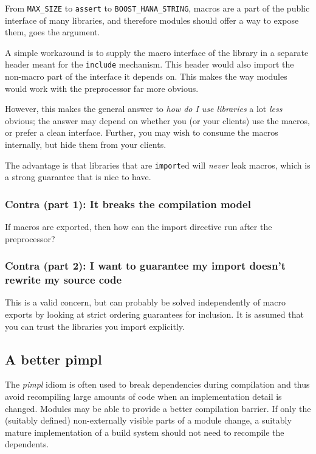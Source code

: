 \documentclass[reqno]{article}
\begin{document}
From \texttt{MAX\_SIZE} to \texttt{assert} to \texttt{BOOST\_HANA\_STRING},
macros are a part of the public interface of many libraries, and therefore
modules should offer a way to expose them, goes the argument.

A simple workaround is to supply the macro interface of the library in a
separate header meant for the \texttt{include} mechanism. This header would
also import the non-macro part of the interface it depends on. This makes the
way modules would work with the preprocessor far more obvious.

However, this makes the general answer to \emph{how do I use libraries} a lot
\emph{less} obvious; the answer may depend on whether you (or your clients) use
the macros, or prefer a clean interface. Further, you may wish to consume the
macros internally, but hide them from your clients. 

The advantage is that libraries that are \texttt{import}ed will \emph{never}
leak macros, which is a strong guarantee that is nice to have.

\subsubsection{Contra (part 1): It breaks the compilation model}

If macros are exported, then how can the import directive run after the
preprocessor?


\subsubsection{Contra (part 2): I want to guarantee my import doesn't rewrite my source code}

This is a valid concern, but can probably be solved independently of macro
exports by looking at strict ordering guarantees for inclusion. It is assumed
that you can trust the libraries you import explicitly.


\subsection{A better pimpl}

The \emph{pimpl} idiom is often used to break dependencies during compilation
and thus avoid recompiling large amounts of code when an implementation detail
is changed.  Modules may be able to provide a better compilation barrier. If
only the (suitably defined) non-externally visible parts of a module change, a
suitably mature implementation of a build system should not need to recompile
the dependents.
\end{document}
